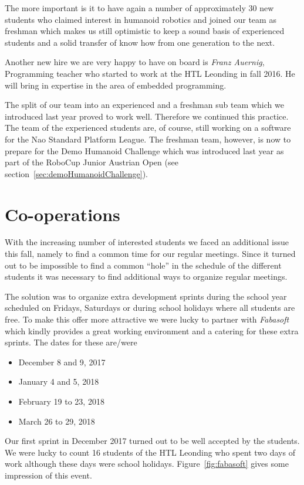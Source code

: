 \documentclass[11pt]{article}
\begin{document}
The more important is it to have again a number of approximately 30 new students who claimed interest in humanoid robotics and joined our team as freshman which makes us still optimistic to keep a sound basis of experienced students and a solid transfer of know how from one generation to the next.

Another new hire we are very happy to have on board is {\em Franz Auernig},  Programming teacher who started to work at the HTL Leonding in fall 2016. He will bring in expertise in the area of embedded programming.

The split of our team into an experienced and a freshman sub team which we introduced last year proved to work well. Therefore we continued this practice. The team of the experienced students are, of course, still working on a software for the Nao Standard Platform League. The freshman team, however, is now to prepare for the Demo Humanoid Challenge which was introduced last year as part of the RoboCup Junior Austrian Open (see section~\ref{sec:demoHumanoidChallenge}).

\section{Co-operations}
With the increasing number of interested students we faced an additional issue this fall, namely to find a common time for our regular meetings. Since it turned out to be impossible to find a common ``hole'' in the schedule of the different students it was necessary to find additional ways to organize regular meetings.

The solution was to organize extra development sprints during the school year scheduled on Fridays, Saturdays or during school holidays where all students are free. To make this offer more attractive we were lucky to partner with {\em Fabasoft} which kindly provides a great working environment and a catering for these extra sprints. The dates for these are/were

\begin{itemize}
	\item December 8 and 9, 2017
	\item January 4 and 5, 2018
	\item February 19 to 23, 2018
	\item March 26 to 29, 2018
\end{itemize}

Our first sprint in December 2017 turned out to be well accepted by the students. We were lucky to count 16 students of the HTL Leonding who spent two days of work although these days were school holidays. Figure~\ref{fig:fabasoft} gives some impression of this event.
\end{document}
